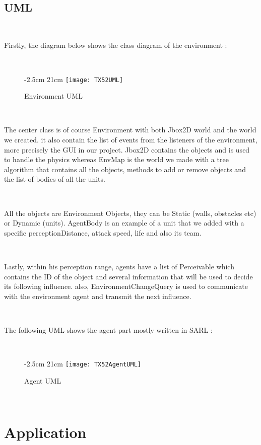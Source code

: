 \documentclass[a4paper,10pt]{book}
\begin{document}
~
\newpage
\subsection{UML}

~

Firstly, the diagram below shows the class diagram of the environment :

~

\begin{figure}[!ht]
  -2.5cm 21cm
 \centering
 \texttt{[image: TX52UML]}
 \caption{Environment UML}
\end{figure}

~

The center class is of course Environment with both Jbox2D world and the world we created. it also contain the list of events
from the listeners of the environment, more precisely the GUI in our project. Jbox2D contains the objects and is used to handle
the physics whereas EnvMap is the world we made with a tree algorithm that contains all the objects, methods to add or remove objects
and the list of bodies of all the units.

~

All the objects are Environment Objects, they can be Static (walls, obstacles etc) or Dynamic (units). AgentBody is an example of a unit
that we added with a specific perceptionDistance, attack speed, life and also its team.

~

Lastly, within his perception range, agents have a list of Perceivable which contains the ID of the object and several information that
will be used to decide its following influence. also, EnvironmentChangeQuery is used to communicate with the environment agent and transmit the next influence.

~

\newpage

The following UML shows the agent part mostly written in SARL :

~

\begin{figure}[!ht]
  -2.5cm 21cm
 \centering
 \texttt{[image: TX52AgentUML]}
 \caption{Agent UML}
\end{figure}

~
\newpage
\section {Application}
\end{document}
